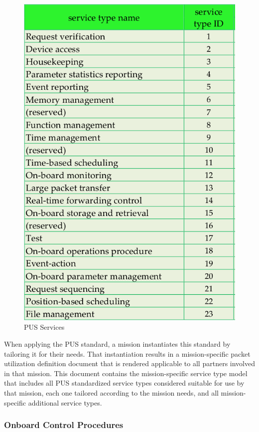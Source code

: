 \begin{figure}[h]
\centering\includegraphics[scale=0.5]{fig/pus_services}
\caption{PUS Services}
\label{fig:PUS Services}
\end{figure}

When applying the PUS standard, a mission instantiates this standard by tailoring it for their needs. That instantiation results in a mission-specific packet utilization definition document that is rendered applicable to all partners involved in that mission. This document contains the mission-specific service type model that includes all PUS standardized service types considered suitable for use by that mission, each one tailored according to the mission needs, and all mission-specific additional service types.

\subsubsection{Onboard Control Procedures}

